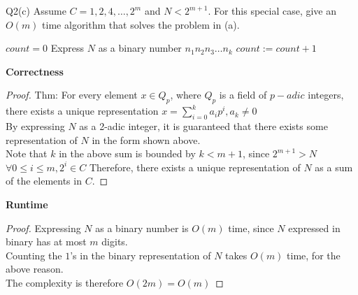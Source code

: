 \begin{problem}
  {Q2(c)}
  Assume $C = 1, 2, 4, \dots, 2^m$ and $N < 2^{m+1}$. For this special case, give an $O(m)$ time algorithm that solves the problem in (a). \\
  \begin{algorithmic}[1]
    \STATE $count = 0$
    \STATE Express $N$ as a binary number $n_1n_2n_3\dots n_k$
    \STATE $count := count + 1$
    \ENDIF
    \ENDFOR
  \end{algorithmic}
  \noindent
  \textbf{Correctness}
  \begin{proof}
      Thm: For every element $x \in Q_p$, where $Q_p$ is a field of $p-adic$ integers,
      there exists a unique representation $x = \sum_{i = 0}^{k} a_ip^i, a_k \neq 0$ \\
      By expressing $N$ as a 2-adic integer, it is guaranteed that there exists some
      representation of $N$ in the form shown above. \\
      Note that $k$ in the above sum is bounded by $k < m+1$, since $2^{m+1} > N$ \\
      $\forall 0 \leq i \leq m, 2^i \in C$
      Therefore, there exists a unique representation of $N$ as a sum of the elements in $C$.
  \end{proof}
  \noindent
  \textbf{Runtime}
  \begin{proof}
      Expressing $N$ as a binary number is $O(m)$ time, since $N$ expressed in binary has at most $m$ digits. \\
      Counting the $1$'s in the binary representation of $N$ takes $O(m)$ time, for the above reason.\\
      The complexity is therefore $O(2m) = O(m)$
  \end{proof}
\end{problem}
